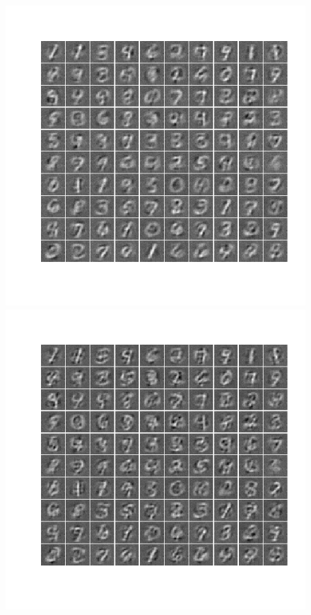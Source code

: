 \documentclass{article}
\begin{document}
\begin{figure}
	\includegraphics[scale=\dns]{denoise16}
	\includegraphics[scale=\dns]{denoise32}
	\caption{}\label{fig:denoise}
\end{figure}
\end{document}
